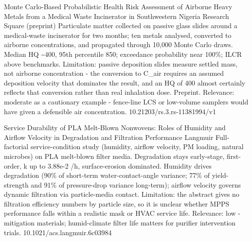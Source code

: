\documentclass[10pt]{article}
\begin{document}
{Monte Carlo-Based Probabilistic Health Risk Assessment of Airborne Heavy Metals from a Medical Waste Incinerator in Southwestern Nigeria}
{Research Square (preprint)}
{Particulate matter collected on passive glass slides around a medical-waste incinerator for two months; ten metals analysed, converted to airborne concentrations, and propagated through 10,000 Monte Carlo draws. Median HQ \textasciitilde{}400, 95th percentile 850; exceedance probability near 100\%; ILCR above benchmarks. Limitation: passive deposition slides measure settled mass, not airborne concentration - the conversion to C\_air requires an assumed deposition velocity that dominates the result, and an HQ of 400 almost certainly reflects that conversion rather than real inhalation dose. Preprint. Relevance: moderate as a cautionary example - fence-line LCS or low-volume samplers would have given a defensible air concentration.}
{10.21203/rs.3.rs-11381994/v1}

{Service Durability of PLA Melt-Blown Nonwovens: Roles of Humidity and Airflow Velocity in Degradation and Filtration Performance}
{Langmuir}
{Full-factorial service-condition study (humidity, airflow velocity, PM loading, natural microbes) on PLA melt-blown filter media. Degradation stays early-stage, first-order, k up to 3.88e-2 /h, surface-erosion dominated. Humidity drives degradation (90\% of short-term water-contact-angle variance; 77\% of yield-strength and 91\% of pressure-drop variance long-term); airflow velocity governs dynamic filtration via particle-media contact. Limitation: the abstract gives no filtration efficiency numbers by particle size, so it is unclear whether MPPS performance falls within a realistic mask or HVAC service life. Relevance: low - mitigation materials; humid-climate filter life matters for purifier intervention trials.}
{10.1021/acs.langmuir.6c03984}

\par{}\baselineskip{}\baselineskip
{}
\end{document}
